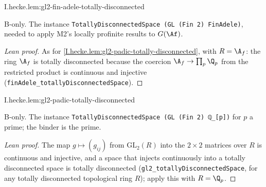 \begin{lemma}
\bonly
{}
\end{lemma}
\begin{tfformal}{I.hecke.lem:gl2-fin-adele-totally-disconnected}
\begin{tffidelity}
B-only. The instance \texttt{TotallyDisconnectedSpace (GL (Fin 2) FinAdele)}, needed to apply M2's locally profinite results to $G(\Af)$.
\end{tffidelity}
\end{tfformal}
\begin{proof}[Lean proof]
As for \cref{I.hecke.lem:gl2-padic-totally-disconnected}, with $R=\A_f$: the ring $\A_f$ is totally disconnected because the coercion $\A_f\to\prod_p\Q_p$ from the restricted product is continuous and injective (\texttt{finAdele\_totallyDisconnectedSpace}).
\end{proof}

\begin{lemma}
\bonly
{}
\end{lemma}
\begin{tfformal}{I.hecke.lem:gl2-padic-totally-disconnected}
\begin{tffidelity}
B-only. The instance \texttt{TotallyDisconnectedSpace (GL (Fin 2) ℚ\_[p])} for $p$ a prime; the binder is the prime.
\end{tffidelity}
\end{tfformal}
\begin{proof}[Lean proof]
The map $g\mapsto(g_{ij})$ from $\mathrm{GL}_2(R)$ into the $2\times2$ matrices over $R$ is continuous and injective, and a space that injects continuously into a totally disconnected space is totally disconnected (\texttt{gl2\_totallyDisconnectedSpace}, for any totally disconnected topological ring $R$); apply this with $R=\Q_p$.
\end{proof}

